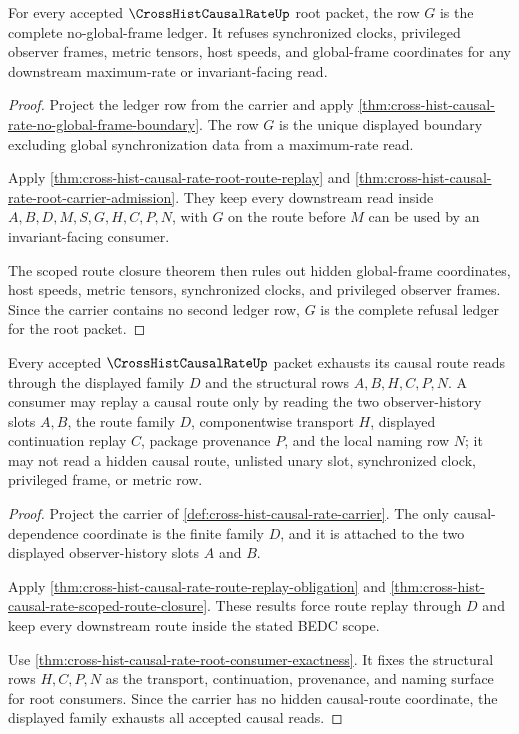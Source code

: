 \begin{theorem}
\label{thm:cross-hist-causal-rate-root-no-frame-ledger}
For every accepted $\CrossHistCausalRateUp$ root packet, the row $G$ is the complete no-global-frame ledger. It refuses synchronized clocks, privileged observer frames, metric tensors, host speeds, and global-frame coordinates for any downstream maximum-rate or invariant-facing read.
\end{theorem}
\begin{proof}
Project the ledger row from the carrier and apply \autoref{thm:cross-hist-causal-rate-no-global-frame-boundary}. The row $G$ is the unique displayed boundary excluding global synchronization data from a maximum-rate read.

Apply \autoref{thm:cross-hist-causal-rate-root-route-replay} and \autoref{thm:cross-hist-causal-rate-root-carrier-admission}. They keep every downstream read inside $A,B,D,M,S,G,H,C,P,N$, with $G$ on the route before $M$ can be used by an invariant-facing consumer.

The scoped route closure theorem then rules out hidden global-frame coordinates, host speeds, metric tensors, synchronized clocks, and privileged observer frames. Since the carrier contains no second ledger row, $G$ is the complete refusal ledger for the root packet.
\end{proof}

\begin{theorem}
\label{thm:cross-hist-causal-rate-route-family-exhaustion}
Every accepted $\CrossHistCausalRateUp$ packet exhausts its causal route reads through the displayed family $D$ and the structural rows $A,B,H,C,P,N$. A consumer may replay a causal route only by reading the two observer-history slots $A,B$, the route family $D$, componentwise transport $H$, displayed continuation replay $C$, package provenance $P$, and the local naming row $N$; it may not read a hidden causal route, unlisted unary slot, synchronized clock, privileged frame, or metric row.
\end{theorem}
\begin{proof}
Project the carrier of \autoref{def:cross-hist-causal-rate-carrier}. The only causal-dependence coordinate is the finite family $D$, and it is attached to the two displayed observer-history slots $A$ and $B$.

Apply \autoref{thm:cross-hist-causal-rate-route-replay-obligation} and \autoref{thm:cross-hist-causal-rate-scoped-route-closure}. These results force route replay through $D$ and keep every downstream route inside the stated BEDC scope.

Use \autoref{thm:cross-hist-causal-rate-root-consumer-exactness}. It fixes the structural rows $H,C,P,N$ as the transport, continuation, provenance, and naming surface for root consumers. Since the carrier has no hidden causal-route coordinate, the displayed family exhausts all accepted causal reads.
\end{proof}

